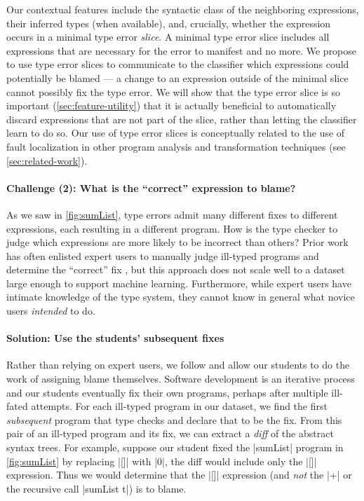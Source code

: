 Our contextual features include the syntactic class of the neighboring
expressions, their inferred types (when available), and, crucially, whether
the expression occurs in a minimal type error \emph{slice}.
%
A minimal type error slice \citep{Haack2003-vc} includes all expressions that
are necessary for the error to manifest and no more.
%
We propose to use type error slices to communicate to the classifier
which expressions could potentially be blamed --- a change to an
expression outside of the minimal slice cannot possibly fix the type
error.
%
We will show that the type error slice is so important
(\autoref{sec:feature-utility}) that it is actually beneficial to
automatically discard expressions that are not part of the slice, rather
than letting the classifier learn to do so.
%
Our use of type error slices is conceptually related to the use of fault
localization in other program analysis and transformation techniques
(see \autoref{sec:related-work}).

\paragraph{\textbf{Challenge (2): What is the ``correct'' expression to blame?}}
As we saw in \autoref{fig:sumList}, type errors admit many different
fixes to different expressions, each resulting in a different program.
%
How is the type checker to judge which expressions are more likely to be
incorrect than others?
%
Prior work has often enlisted expert users to manually judge ill-typed
programs and determine the ``correct'' fix
\citep[\eg][]{Lerner2007-dt,Loncaric2016-uk}, but this approach does not
scale well to a dataset large enough to support machine learning.
%
Furthermore, while expert users have intimate knowledge of the type system,
they cannot know in general what novice users \emph{intended} to do.

\paragraph{\textbf{Solution: Use the students' subsequent fixes}}
%
Rather than relying on expert users, we follow \citet{Zhang2014-lv} and
allow our students to do the work of assigning blame themselves.
%
Software development is an iterative process and our students 
eventually fix their own programs, perhaps after multiple ill-fated
attempts.
%
For each ill-typed program in our dataset, we find the first
\emph{subsequent} program that type checks and declare that to be the
fix.
%
From this pair of an ill-typed program and its fix, we can extract a
\emph{diff} of the abstract syntax trees.
%
For example, suppose our student fixed the |sumList| program in
\autoref{fig:sumList} by replacing |[]| with |0|, the diff would include
only the |[]| expression.
%
Thus we would determine that the |[]| expression (and \emph{not} the
|+| or the recursive call |sumList t|) is to blame.

